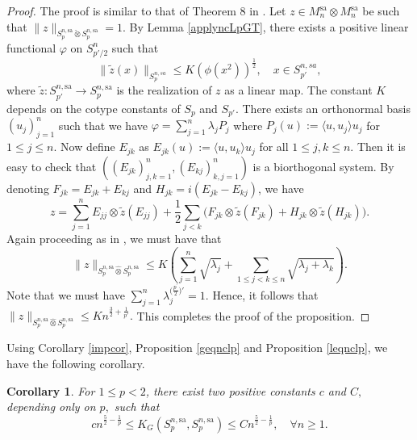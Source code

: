\documentclass[a4paper,oneside,11pt, reqno]{amsart}
\numberwithin{equation}{section}
\newtheorem{corollary}[theorem]{Corollary}
\theoremstyle{plain}
\begin{document}
 \begin{proof}
 The proof is similar to that of Theorem 8 in \cite{XOR games and GT}.
     Let $z\in M_n^{\text{sa}}\otimes M_n^{\text{sa}}$ be such that $\|z\|_{S_p^{n,\text{sa}}\check{\otimes} S_p^{n,\text{sa}}}=1.$ By Lemma \ref{applyncLpGT}, there exists a positive linear functional $\varphi$ on $S_{p'/2}^n$ such that 
     \[\|\widetilde{z}(x)\|_{S_p^{n,sa}}\leqslant K(\phi(x^2))^{\frac{1}{2}},\quad x\in S_{p'}^{n,sa},\]
      where $\widetilde z:S_{p'}^{n,\text{sa}}\to S_p^{n,\text{sa}}$ is the realization of $z$ as a linear map. The constant $K$ depends on the cotype constants of $S_{p}$ and $S_{p'}.$ 
      There exists an orthonormal basis $(u_j)_{j=1}^n$ such that we have $\varphi=\sum_{j=1}^n\lambda_jP_j$ where $P_j(u):=\langle u,u_j\rangle u_j$ for $1\leqslant j\leqslant n.$ Now define $E_{jk}$ as $E_{jk}(u):=\langle u,u_k\rangle u_j$ for all $1\leqslant j,k\leqslant n.$ Then it is easy to check that $((E_{jk})_{j,k=1}^n,(E_{kj})_{k,j=1}^n)$ is a biorthogonal system. By denoting $F_{jk}=E_{jk}+E_{kj}$ and $H_{jk}=i(E_{jk}-E_{kj})$, we have 
     \[z=\sum_{j=1}^nE_{jj}\otimes \widetilde{z}(E_{jj})+\frac{1}{2}\sum_{j<k}\Big(F_{jk}\otimes\widetilde{z}(F_{jk})+H_{jk}\otimes\widetilde{z}(H_{jk})\Big).\] 
     Again proceeding as in \cite{XOR games and GT}, we must have that
\[\|z\|_{S_p^{n,\text{sa}}\hat{\otimes}S_p^{n,\text{sa}}}\leqslant K\left(\sum_{j=1}^n\sqrt{\lambda_j}+\sum_{1\leqslant j<k\leqslant n}\sqrt{\lambda_j+\lambda_k}\right).\] 
Note that we must have $\sum_{j=1}^n\lambda_j^{\big(\frac{p^\prime}{2}\big)'}=1.$  
Hence, it follows that $\|z\|_{S_p^{n,\text{sa}}\hat{\otimes}S_p^{n,\text{sa}}}\leqslant Kn ^{\frac{3}{2}+\frac{1}{p'}}.$
This completes the proof of the proposition.
\end{proof}
Using Corollary \ref{impcor}, Proposition \ref{geqnclp} and Proposition \ref{leqnclp}, we have the following corollary.
 \begin{corollary}
    For $1\leqslant p<2$, there exist two positive constants $c$ and $C,$ depending only on $p,$ such that 
    \[cn^{\frac{5}{2}-\frac{1}{p}}\leqslant K_G(S_p^{n,\text{sa}},S_p^{n,\text{sa}})\leqslant Cn^{\frac{5}{2}-\frac{1}{p}}, \quad \forall n\geqslant 1.\] 
 \end{corollary}
 
\end{document}
